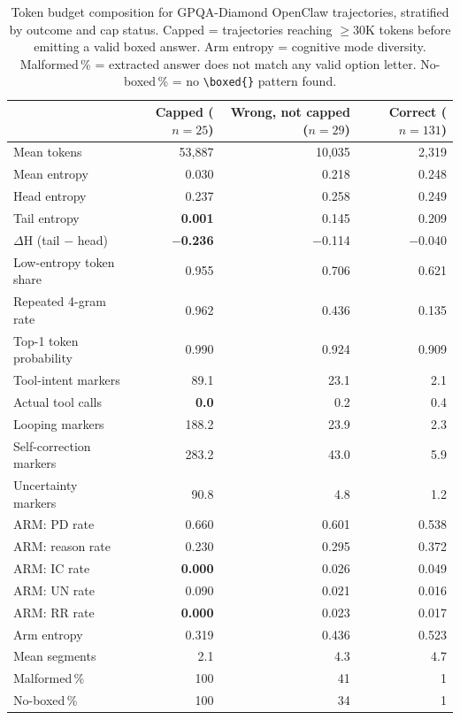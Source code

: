 \begin{table}[t]
\centering
\small
\caption{%
  Token budget composition for GPQA-Diamond OpenClaw trajectories, stratified
  by outcome and cap status.
  Capped = trajectories reaching $\ge$30K tokens before emitting a valid boxed answer.
  Arm entropy = cognitive mode diversity.
  Malformed\,\% = extracted answer does not match any valid option letter.
  No-boxed\,\% = no \texttt{\textbackslash boxed\{\}} pattern found.
}
\label{tab:cross-timeout}
\setlength{\tabcolsep}{2.5pt}
\begin{tabular}{lrrr}
\toprule
& Capped ($n{=}25$) & Wrong, not capped ($n{=}29$) & Correct ($n{=}131$) \\
\midrule
Mean tokens            & 53{,}887 & 10{,}035 & 2{,}319 \\
Mean entropy           & 0.030 & 0.218 & 0.248 \\
Head entropy           & 0.237 & 0.258 & 0.249 \\
Tail entropy           & \textbf{0.001} & 0.145 & 0.209 \\
$\Delta$H (tail $-$ head) & \textbf{$-$0.236} & $-$0.114 & $-$0.040 \\
Low-entropy token share & 0.955 & 0.706 & 0.621 \\
Repeated 4-gram rate   & 0.962 & 0.436 & 0.135 \\
Top-1 token probability & 0.990 & 0.924 & 0.909 \\
\midrule
Tool-intent markers    & 89.1 & 23.1 & 2.1 \\
Actual tool calls      & \textbf{0.0} & 0.2 & 0.4 \\
\midrule
Looping markers        & 188.2 & 23.9 & 2.3 \\
Self-correction markers & 283.2 & 43.0 & 5.9 \\
Uncertainty markers    & 90.8 & 4.8 & 1.2 \\
\midrule
ARM: PD rate           & 0.660 & 0.601 & 0.538 \\
ARM: reason rate       & 0.230 & 0.295 & 0.372 \\
ARM: IC rate           & \textbf{0.000} & 0.026 & 0.049 \\
ARM: UN rate           & 0.090 & 0.021 & 0.016 \\
ARM: RR rate           & \textbf{0.000} & 0.023 & 0.017 \\
Arm entropy            & 0.319 & 0.436 & 0.523 \\
Mean segments          & 2.1 & 4.3 & 4.7 \\
\midrule
Malformed\,\%          & 100 & 41 & 1 \\
No-boxed\,\%           & 100 & 34 & 1 \\
\bottomrule
\end{tabular}
\end{table}

